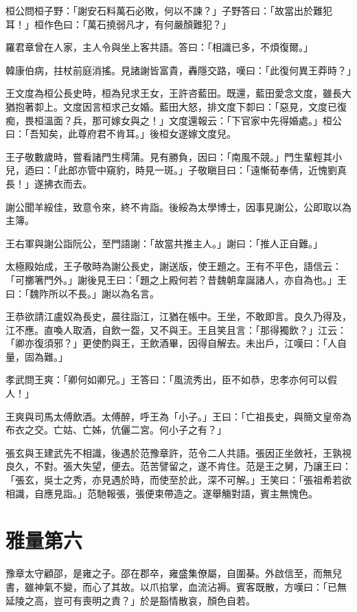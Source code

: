 桓公問桓子野：「謝安石料萬石必敗，何以不諫？」子野答曰：「故當出於難犯耳！」桓作色曰：「萬石撓弱凡才，有何嚴顏難犯？」

羅君章曾在人家，主人令與坐上客共語。答曰：「相識已多，不煩復爾。」

韓康伯病，拄杖前庭消搖。見諸謝皆富貴，轟隱交路，嘆曰：「此復何異王莽時？」

王文度為桓公長史時，桓為兒求王女，王許咨藍田。既還，藍田愛念文度，雖長大猶抱著厀上。文度因言桓求己女婚。藍田大怒，排文度下厀曰：「惡見，文度已復痴，畏桓溫面？兵，那可嫁女與之！」文度還報云：「下官家中先得婚處。」桓公曰：「吾知矣，此尊府君不肯耳。」後桓女遂嫁文度兒。

王子敬數歲時，嘗看諸門生樗蒲。見有勝負，因曰：「南風不競。」門生輩輕其小兒，迺曰：「此郎亦管中窺豹，時見一斑。」子敬瞋目曰：「遠慚荀奉倩，近愧劉真長！」遂拂衣而去。

謝公聞羊綏佳，致意令來，終不肯詣。後綏為太學博士，因事見謝公，公即取以為主簿。

王右軍與謝公詣阮公，至門語謝：「故當共推主人。」謝曰：「推人正自難。」

太極殿始成，王子敬時為謝公長史，謝送版，使王題之。王有不平色，語信云：「可擲箸門外。」謝後見王曰：「題之上殿何若？昔魏朝韋誕諸人，亦自為也。」王曰：「魏阼所以不長。」謝以為名言。

王恭欲請江盧奴為長史，晨往詣江，江猶在帳中。王坐，不敢即言。良久乃得及，江不應。直喚人取酒，自飲一盌，又不與王。王且笑且言：「那得獨飲？」江云：「卿亦復須邪？」更使酌與王，王飲酒畢，因得自解去。未出戶，江嘆曰：「人自量，固為難。」

孝武問王爽：「卿何如卿兄。」王答曰：「風流秀出，臣不如恭，忠孝亦何可以假人！」

王爽與司馬太傅飲酒。太傅醉，呼王為「小子。」王曰：「亡祖長史，與簡文皇帝為布衣之交。亡姑、亡姊，伉儷二宮。何小子之有？」

張玄與王建武先不相識，後遇於范豫章許，范令二人共語。張因正坐斂衽，王孰視良久，不對。張大失望，便去。范苦譬留之，遂不肯住。范是王之舅，乃讓王曰：「張玄，吳士之秀，亦見遇於時，而使至於此，深不可解。」王笑曰：「張祖希若欲相識，自應見詣。」范馳報張，張便束帶造之。遂舉觴對語，賓主無愧色。



\chapter{雅量第六}

豫章太守顧邵，是雍之子。邵在郡卒，雍盛集僚屬，自圍棊。外啟信至，而無兒書，雖神氣不變，而心了其故。以爪掐掌，血流沾褥。賓客既散，方嘆曰：「已無延陵之高，豈可有喪明之責？」於是豁情散哀，顏色自若。


